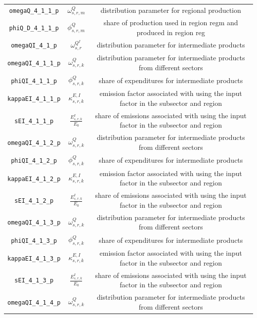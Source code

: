 \begin{center}
\begin{longtable}{ccc}
\texttt{omegaQ\_4\_1\_1\_p} & ${\omega^{Q}_{s,r,m}}$ & distribution parameter for regional production\\
\texttt{phiQ\_D\_4\_1\_1\_p} & ${\phi^{Q}_{s,r,m}}$ & share of production used in region regm and produced in region reg\\
\texttt{omegaQI\_4\_1\_p} & ${\omega^{Q^{I}}_{s,r}}$ & distribution parameter for intermediate products\\
\texttt{omegaQI\_4\_1\_1\_p} & ${\omega^{Q}_{s,r,k}}$ & distribution parameter for intermediate products from different sectors\\
\texttt{phiQI\_4\_1\_1\_p} & ${\phi^{Q}_{s,r,k}}$ & share of expenditures for intermediate products\\
\texttt{kappaEI\_4\_1\_1\_p} & ${\kappa^{E,I}_{s,r,k}}$ & emission factor associated with using the input factor in the subsector and region\\
\texttt{sEI\_4\_1\_1\_p} & ${\frac{E^{I}_{s,r,k}}{E_0}}$ & share of emissions associated with using the input factor in the subsector and region\\
\texttt{omegaQI\_4\_1\_2\_p} & ${\omega^{Q}_{s,r,k}}$ & distribution parameter for intermediate products from different sectors\\
\texttt{phiQI\_4\_1\_2\_p} & ${\phi^{Q}_{s,r,k}}$ & share of expenditures for intermediate products\\
\texttt{kappaEI\_4\_1\_2\_p} & ${\kappa^{E,I}_{s,r,k}}$ & emission factor associated with using the input factor in the subsector and region\\
\texttt{sEI\_4\_1\_2\_p} & ${\frac{E^{I}_{s,r,k}}{E_0}}$ & share of emissions associated with using the input factor in the subsector and region\\
\texttt{omegaQI\_4\_1\_3\_p} & ${\omega^{Q}_{s,r,k}}$ & distribution parameter for intermediate products from different sectors\\
\texttt{phiQI\_4\_1\_3\_p} & ${\phi^{Q}_{s,r,k}}$ & share of expenditures for intermediate products\\
\texttt{kappaEI\_4\_1\_3\_p} & ${\kappa^{E,I}_{s,r,k}}$ & emission factor associated with using the input factor in the subsector and region\\
\texttt{sEI\_4\_1\_3\_p} & ${\frac{E^{I}_{s,r,k}}{E_0}}$ & share of emissions associated with using the input factor in the subsector and region\\
\texttt{omegaQI\_4\_1\_4\_p} & ${\omega^{Q}_{s,r,k}}$ & distribution parameter for intermediate products from different sectors\\

\end{longtable}
\end{center}
